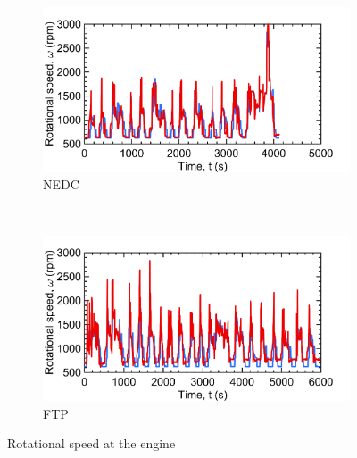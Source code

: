\begin{figure}[ht]
  \centering
  \begin{subfigure}[b]{0.45\textwidth}
    \includegraphics[width=\textwidth]{figures/model/NEDC_plt_w_engine.png}
    \caption{NEDC}
    \label{fig:NEDC_w_engine}
  \end{subfigure}
  ~ %
  \begin{subfigure}[b]{0.45\textwidth}
    \includegraphics[width=\textwidth]{figures/model/FTP_plt_w_engine.png}
    \caption{FTP}
    \label{fig:FTP_w_engine}
  \end{subfigure}
  \caption{Rotational speed at the engine}\label{fig:w_engine}
\end{figure}

